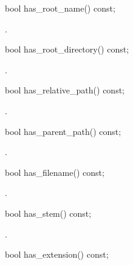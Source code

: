 %
\begin{itemdecl}
bool has_root_name() const;
\end{itemdecl}

\begin{itemdescr}
\pnum
\returns
{}.
\end{itemdescr}

%
\begin{itemdecl}
bool has_root_directory() const;
\end{itemdecl}

\begin{itemdescr}
\pnum
\returns
{}.
\end{itemdescr}

%
\begin{itemdecl}
bool has_relative_path() const;
\end{itemdecl}

\begin{itemdescr}
\pnum
\returns
{}.
\end{itemdescr}

%
\begin{itemdecl}
bool has_parent_path() const;
\end{itemdecl}

\begin{itemdescr}
\pnum
\returns
{}.
\end{itemdescr}

%
\begin{itemdecl}
bool has_filename() const;
\end{itemdecl}

\begin{itemdescr}
\pnum
\returns
{}.
\end{itemdescr}

%
\begin{itemdecl}
bool has_stem() const;
\end{itemdecl}

\begin{itemdescr}
\pnum
\returns
{}.
\end{itemdescr}

%
\begin{itemdecl}
bool has_extension() const;
\end{itemdecl}

